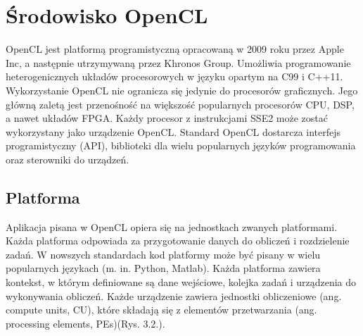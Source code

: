 
\section{Środowisko OpenCL}\label{sec:OpenCL}

OpenCL jest platformą programistyczną opracowaną w 2009 roku przez Apple Inc, a następnie utrzymywaną przez Khronos Group. Umożliwia programowanie heterogenicznych układów procesorowych w języku opartym na C99 i C++11. Wykorzystanie OpenCL nie ogranicza się jedynie do procesorów graficznych. Jego główną zaletą jest przenośność na większość popularnych procesorów CPU, DSP, a nawet układów FPGA. Każdy procesor z instrukcjami SSE2 może zostać wykorzystany jako urządzenie OpenCL. Standard OpenCL dostarcza interfejs programistyczny (API), biblioteki dla wielu popularnych języków programowania oraz sterowniki do urządzeń.

\subsection{Platforma}\label{sec:platforma}

Aplikacja pisana w OpenCL opiera się na jednostkach zwanych platformami. Każda platforma odpowiada za przygotowanie danych do obliczeń i rozdzielenie zadań. W nowszych standardach kod platformy może być pisany w wielu popularnych językach  (m. in. Python, Matlab). Każda platforma zawiera kontekst, w którym definiowane są dane wejściowe, kolejka zadań i urządzenia do wykonywania obliczeń. Każde urządzenie zawiera jednostki obliczeniowe (ang. compute units, CU), które składają się z elementów przetwarzania (ang. processing elements, PEs)(Rys. 3.2.). 

